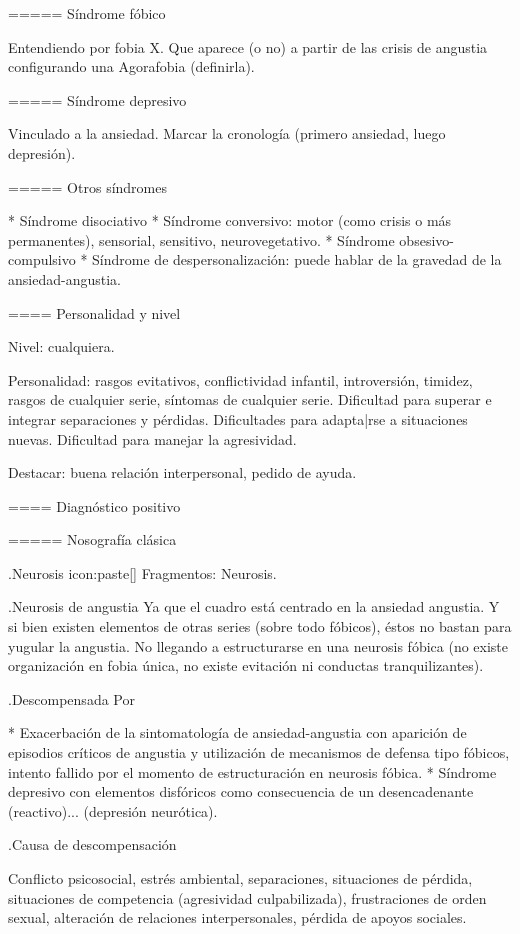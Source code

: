 \documentclass[encares.tex]{subfiles}
\begin{document}
===== Síndrome fóbico

Entendiendo por fobia X. Que aparece (o no) a partir de las crisis de angustia configurando una Agorafobia (definirla).

===== Síndrome depresivo

Vinculado a la ansiedad. Marcar la cronología (primero ansiedad, luego depresión).

===== Otros síndromes

* Síndrome disociativo
* Síndrome conversivo: motor (como crisis o más permanentes), sensorial, sensitivo, neurovegetativo.
* Síndrome obsesivo-compulsivo
* Síndrome de despersonalización: puede hablar de la gravedad de la ansiedad-angustia.

==== Personalidad y nivel

Nivel: cualquiera.

Personalidad: rasgos evitativos, conflictividad infantil, introversión, timidez, rasgos de cualquier serie, síntomas de cualquier serie. Dificultad para superar e integrar separaciones y pérdidas. Dificultades para adapta|rse a situaciones nuevas. Dificultad para manejar la agresividad.

Destacar: buena relación interpersonal, pedido de ayuda.

==== Diagnóstico positivo

===== Nosografía clásica

.Neurosis
icon:paste[] Fragmentos: Neurosis.

.Neurosis de angustia
Ya que el cuadro está centrado en la ansiedad angustia. Y si bien existen elementos de otras series (sobre todo fóbicos), éstos no bastan para yugular la angustia. No llegando a estructurarse en una neurosis fóbica (no existe organización en fobia única, no existe evitación ni conductas tranquilizantes).

.Descompensada
Por

* Exacerbación de la sintomatología de ansiedad-angustia con aparición de episodios críticos de angustia y utilización de mecanismos de defensa tipo fóbicos, intento fallido por el momento de estructuración en neurosis fóbica.
* Síndrome depresivo con elementos disfóricos como consecuencia de un desencadenante (reactivo)... (depresión neurótica).

.Causa de descompensación

Conflicto psicosocial, estrés ambiental, separaciones, situaciones de pérdida, situaciones de competencia (agresividad culpabilizada), frustraciones de orden sexual, alteración de relaciones interpersonales, pérdida de apoyos sociales.
\end{document}
